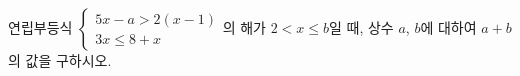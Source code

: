 연립부등식 $\begin{cases} 5x-a>2(x-1) \\ 3x\le 8+x \end{cases}$의 해가 $2<x\le b$일 때, 상수 $a$, $b$에 대하여 $a+b$의 값을 구하시오.
